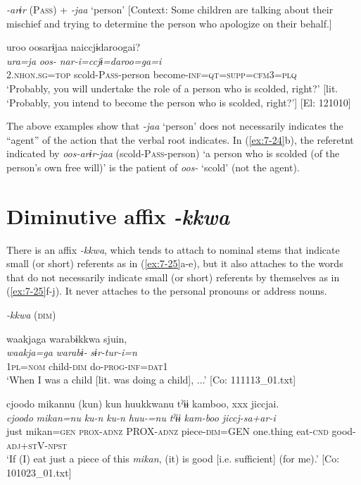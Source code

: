 \ex \label{ex:7:24b}\textit{{}-arɨr} (P\textsc{ass}) + \textit{{}-jaa} ‘person’ [Context: Some children are talking about their mischief and trying to determine the person who apologize on their behalf.]

{\TM}
\glll  uroo  oosarɨjaa  naiccjɨdaroogai?\\
\textit{ura=ja}  \textit{oos-}  \textit{nar-i=ccjɨ=daroo=ga=i}\\
2.\textsc{nhon}.\textsc{sg}=\textsc{top}  scold-P\textsc{ass}-person  become-\textsc{inf}=\textsc{qt}=\textsc{supp}=\textsc{cfm}3=\textsc{plq}\\
\glt ‘Probably, you will undertake the role of a person who is scolded, right?’ [lit. ‘Probably, you intend to become the person who is scolded, right?’] [El: 121010]

\z
\z

The above examples show that \textit{{}-jaa} ‘person’ does not necessarily indicates the “agent” of the action that the verbal root indicates. In (\ref{ex:7-24}b), the referetnt indicated by \textit{oos-arɨr-jaa} (scold-P\textsc{ass}-person) ‘a person who is scolded (of the person’s own free will)’ is the patient of \textit{oos-} ‘scold’ (not the agent).

\section{Diminutive affix \textit{{}-kkwa}}

There is an affix \textit{{}-kkwa}, which tends to attach to nominal stems that indicate small (or short) referents as in (\ref{ex:7-25}a-e), but it also attaches to the words that do not necessarily indicate small (or short) referents by themselves as in (\ref{ex:7-25}f-j). It never attaches to the personal pronouns or address nouns.

\ea \label{ex:7:25}  \textit{{}-kkwa} (\textsc{dim})

\ea \label{ex:7:25a}{\TM}
\glll  waakjaga  warabɨkkwa  sjuin,\\
\textit{waakja=ga}  \textit{warabɨ-}  \textit{sɨr-tur-i=n}\\
1\textsc{pl}=\textsc{nom}  child-\textsc{dim}  do-\textsc{prog}-\textsc{inf}=\textsc{dat}1\\
\glt ‘When I was a child [lit. was doing a child], ...’ [Co: 111113\_01.txt]

\ex \label{ex:7:25b}{\TM}
\glll  {\textbar}cjoodo  mikan{\textbar}nu  (kun)  kun  huukkwanu  tˀɨɨ  kamboo,  xxx  jiccjai.\\
\textit{cjoodo}  \textit{mikan=nu}  \textit{ku-n}  \textit{ku-n}  \textit{huu-=nu} \textit{tˀɨɨ}  \textit{kam-boo}    \textit{jiccj-sa+ar-i}\\
just  mikan=\textsc{gen}  \textsc{prox}-\textsc{adnz}  PROX-\textsc{adnz}  piece-\textsc{dim}=GEN  one.thing  eat-\textsc{cnd}    good-\textsc{adj}+\textsc{st}V-\textsc{npst}\\
\glt ‘If (I) eat just a piece of this \textit{mikan}, (it) is good [i.e. sufficient] (for me).’ [Co: 101023\_01.txt]

